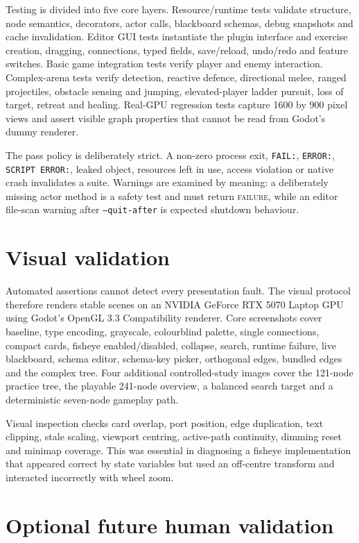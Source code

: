 Testing is divided into five core layers. Resource/runtime tests validate structure, node semantics, decorators, actor calls, blackboard schemas, debug snapshots and cache invalidation. Editor GUI tests instantiate the plugin interface and exercise creation, dragging, connections, typed fields, save/reload, undo/redo and feature switches. Basic game integration tests verify player and enemy interaction. Complex-arena tests verify detection, reactive defence, directional melee, ranged projectiles, obstacle sensing and jumping, elevated-player ladder pursuit, loss of target, retreat and healing. Real-\ac{GPU} regression tests capture 1600 by 900 pixel views and assert visible graph properties that cannot be read from Godot's dummy renderer.

The pass policy is deliberately strict. A non-zero process exit, \texttt{FAIL:}, \texttt{ERROR:}, \texttt{SCRIPT ERROR:}, leaked object, resources left in use, access violation or native crash invalidates a suite. Warnings are examined by meaning: a deliberately missing actor method is a safety test and must return \textsc{failure}, while an editor file-scan warning after \texttt{--quit-after} is expected shutdown behaviour.

\section{Visual validation}

Automated assertions cannot detect every presentation fault. The visual protocol therefore renders stable scenes on an NVIDIA GeForce RTX 5070 Laptop \ac{GPU} using Godot's OpenGL 3.3 Compatibility renderer. Core screenshots cover baseline, type encoding, grayscale, colourblind palette, single connections, compact cards, fisheye enabled/disabled, collapse, search, runtime failure, live blackboard, schema editor, schema-key picker, orthogonal edges, bundled edges and the complex tree. Four additional controlled-study images cover the 121-node practice tree, the playable 241-node overview, a balanced search target and a deterministic seven-node gameplay path.

Visual inspection checks card overlap, port position, edge duplication, text clipping, stale scaling, viewport centring, active-path continuity, dimming reset and minimap coverage. This was essential in diagnosing a fisheye implementation that appeared correct by state variables but used an off-centre transform and interacted incorrectly with wheel zoom.

\section{Optional future human validation}


